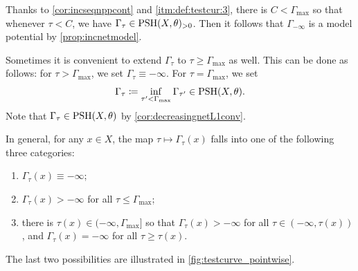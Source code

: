 Thanks to \cref{cor:incseqnppcont} and \ref{itm:def:testcur:3}, there is $C<\Gamma_{\max}$ so that whenever $\tau<C$, we have $\Gamma_{\tau}\in \mathrm{PSH}(X,\theta)_{>0}$. Then it follows that $\Gamma_{-\infty}$ is a model potential by \cref{prop:incnetmodel}.

\begin{remark}\label{rmk:extendtestcur}
    Sometimes it is convenient to extend $\Gamma_{\tau}$ to $\tau\geq \Gamma_{\max}$ as well. This can be done as follows: for $\tau>\Gamma_{\max}$, we set $\Gamma_{\tau}\equiv -\infty$. For $\tau=\Gamma_{\max}$, we set
    \[
        \Gamma_{\tau}\coloneqq \inf_{\tau'<\Gamma_{\max}}\Gamma_{\tau'}\in \mathrm{PSH}(X,\theta).
    \]
    Note that $\Gamma_{\tau}\in \mathrm{PSH}(X,\theta)$ by \cref{cor:decreasingnetL1conv}.
\end{remark}

In general, for any $x\in X$, the map $\tau\mapsto \Gamma_{\tau}(x)$ falls into one of the following three categories:
\begin{enumerate}
    \item\label{itm:Gammataux_1} $\Gamma_{\tau}(x)\equiv -\infty$;
    \item\label{itm:Gammataux_2} $\Gamma_{\tau}(x)>-\infty$ for all $\tau\leq \Gamma_{\max}$;
    \item\label{itm:Gammataux_3} there is $\tau(x)\in (-\infty,\Gamma_{\max}]$ so that $\Gamma_{\tau}(x)>-\infty$ for all $\tau \in (-\infty,\tau(x))$, and $\Gamma_{\tau}(x)=-\infty$ for all $\tau\geq \tau(x)$.
\end{enumerate}
The last two possibilities are illustrated in \cref{fig:testcurve_pointwise}.

